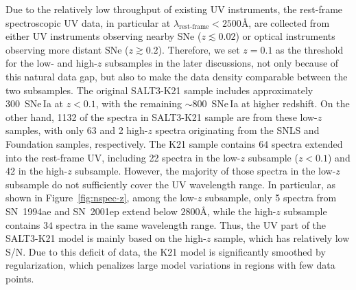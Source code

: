 \documentclass[twocolumn,tighten,times,floatfix]{aastex631}
\begin{document}
Due to the relatively low throughput of existing UV instruments, the rest-frame spectroscopic UV data, in particular at $\lambda_{\textrm{rest-frame}}<2500$\AA, are collected from either UV instruments observing nearby SNe ($z\lesssim0.02$) or optical instruments observing more distant SNe ($z\gtrsim0.2$). Therefore, we set $z = 0.1$ as the threshold for the low- and high-$z$ subsamples in the later discussions, not only because of this natural data gap, but also to make the data density comparable between the two subsamples.
The original SALT3-K21 sample includes approximately 300~SNe\,Ia at $z < 0.1$, with the remaining $\sim$800~SNe\,Ia at higher redshift. On the other hand, 1132 of the spectra in SALT3-K21 sample are from these low-$z$ samples, with only 63 and 2 high-$z$ spectra originating from the SNLS and Foundation samples, respectively. 
The K21 sample contains $64$ spectra extended into the rest-frame UV, including 22 spectra in the low-$z$ subsample ($z<0.1$) and 42 in the high-$z$ subsample. However, the majority of those spectra in the low-$z$ subsample do not sufficiently cover the UV wavelength range. In particular, as shown in Figure~\ref{fig:nspec-z}, among the low-$z$ subsample, only 5 spectra from SN~1994ae and SN~2001ep extend below $2800$\AA, while the high-$z$ subsample contains $34$ spectra in the same wavelength range. Thus, the UV part of the SALT3-K21 model is mainly based on the high-$z$ sample, which has relatively low S/N.  Due to this deficit of data, the K21 model is significantly smoothed by regularization, which penalizes large model variations in regions with few data points.
\end{document}
